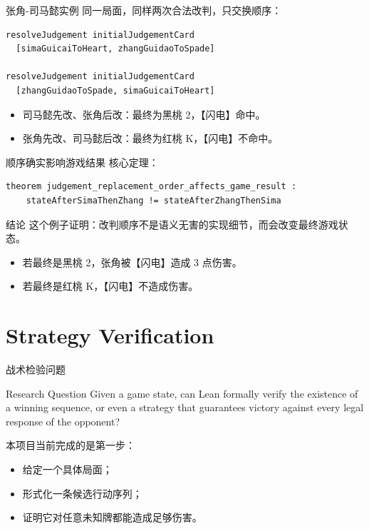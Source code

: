 \documentclass[UTF8,aspectratio=169]{ctexbeamer}
\begin{document}
\begin{frame}[fragile]{张角-司马懿实例}
  同一局面，同样两次合法改判，只交换顺序：

  \begin{verbatim}
resolveJudgement initialJudgementCard
  [simaGuicaiToHeart, zhangGuidaoToSpade]

resolveJudgement initialJudgementCard
  [zhangGuidaoToSpade, simaGuicaiToHeart]
  \end{verbatim}

  \begin{itemize}
    \item 司马懿先改、张角后改：最终为黑桃 2，【闪电】命中。
    \item 张角先改、司马懿后改：最终为红桃 K，【闪电】不命中。
  \end{itemize}
\end{frame}

\begin{frame}[fragile]{顺序确实影响游戏结果}
  核心定理：

  \begin{verbatim}
theorem judgement_replacement_order_affects_game_result :
    stateAfterSimaThenZhang != stateAfterZhangThenSima
  \end{verbatim}

  \begin{block}{结论}
    这个例子证明：改判顺序不是语义无害的实现细节，而会改变最终游戏状态。
  \end{block}

  \begin{itemize}
    \item 若最终是黑桃 2，张角被【闪电】造成 3 点伤害。
    \item 若最终是红桃 K，【闪电】不造成伤害。
  \end{itemize}
\end{frame}

\section{Strategy Verification}

\begin{frame}{战术检验问题}
  \begin{block}{Research Question}
    Given a game state, can Lean formally verify the existence of a winning
    sequence, or even a strategy that guarantees victory against every legal
    response of the opponent?
  \end{block}

  本项目当前完成的是第一步：

  \begin{itemize}
    \item 给定一个具体局面；
    \item 形式化一条候选行动序列；
    \item 证明它对任意未知牌都能造成足够伤害。
  \end{itemize}
\end{frame}
\end{document}
